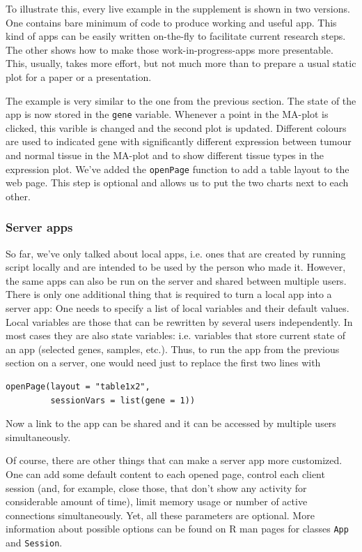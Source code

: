 \documentclass[twocolumn,10pt]{article}
\begin{document}
To illustrate this, every live example in the supplement is shown in two versions. One contains bare minimum of code to produce working and useful app. This kind of apps can be easily written on-the-fly to facilitate current research steps. The other shows how to make those work-in-progress-apps more presentable. This, usually, takes more effort, but not much more than to prepare a usual static plot for a paper or a presentation.


The example is very similar to the one from the previous section. The state of the app is now stored in the \texttt{gene} variable. Whenever a point in the MA-plot is clicked, this varible is changed and the second plot is updated. Different colours are used to indicated gene with significantly different expression between tumour and normal tissue in the MA-plot and to show different tissue types in the expression plot. We've added the \texttt{openPage} function to add a table layout to the web page. This step is optional and allows us to put the two charts next to each other.

\subsubsection{Server apps}

So far, we've only talked about local apps, i.e. ones that are created by running script locally and are intended to be used by the person who made it. However, the same apps can also be run on the server and shared between multiple users. There is only one additional thing that is required to turn a local app into a server app: One needs to specify a list of local variables and their default values. Local variables are those that can be rewritten by several users independently. In most cases they are also state variables: i.e. variables that store current state of an app (selected genes, samples, etc.). Thus, to run the app from the previous section on a server, one would need just to replace the first two lines with

\begin{verbatim}
openPage(layout = "table1x2", 
         sessionVars = list(gene = 1))
\end{verbatim}

Now a link to the app  can be shared and it can be accessed by multiple users simultaneously.

Of course, there are other things that can make a server app more customized. One can add some default content to each opened page, control each client session (and, for example, close those, that don't show any activity for considerable amount of time), limit memory usage or number of active connections simultaneously. Yet, all these parameters are optional. More information about possible options can be found on R man pages for classes \texttt{App} and \texttt{Session}.
\end{document}
